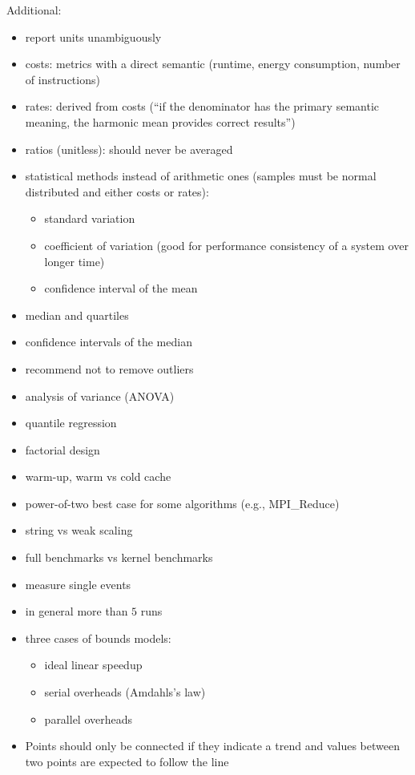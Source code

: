 Additional: 
\begin{itemize}
    \item report units unambiguously
    \item costs: metrics with a direct semantic (runtime, energy consumption, number of instructions)
    \item rates: derived from costs (\enquote{if the denominator has the primary semantic meaning, the harmonic mean provides correct results})
    \item ratios (unitless): should never be averaged
    \item statistical methods instead of arithmetic ones (samples must be normal distributed and either costs or rates): 
    \begin{itemize}
        \item standard variation
        \item coefficient of variation (good for performance consistency of a system over longer time)
        \item confidence interval of the mean
    \end{itemize}
    \item median and quartiles
    \item confidence intervals of the median
    \item recommend not to remove outliers
    \item analysis of variance (ANOVA)
    \item quantile regression
    \item factorial design
    \item warm-up, warm vs cold cache
    \item power-of-two best case for some algorithms (e.g., MPI\_Reduce)
    \item string vs weak scaling
    \item full benchmarks vs kernel benchmarks
    \item measure single events
    \item in general more than $5$ runs
    \item three cases of bounds models:
    \begin{itemize}
        \item ideal linear speedup
        \item serial overheads (Amdahls's law)
        \item parallel overheads
    \end{itemize}
    \item Points should only be connected if they indicate a trend and values between two points are expected to follow the line
\end{itemize}

